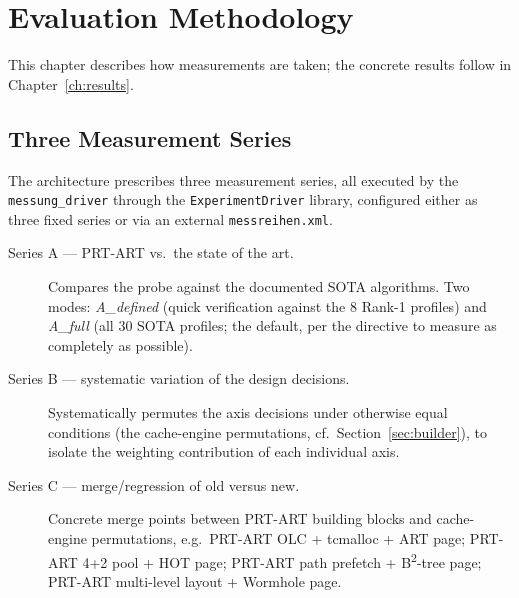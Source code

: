 \chapter{Evaluation Methodology}\label{ch:methodology}

This chapter describes how measurements are taken; the concrete results follow in
Chapter~\ref{ch:results}.

\section{Three Measurement Series}\label{sec:series}

The architecture prescribes three measurement series, all executed by the \texttt{messung\_driver}
through the \texttt{ExperimentDriver} library, configured either as three fixed series or via an
external \texttt{messreihen.xml}.

\begin{description}
  \item[Series A --- PRT-ART vs.\ the state of the art.] Compares the probe against the documented
  SOTA algorithms. Two modes: \emph{A\_defined} (quick verification against the 8 Rank-1 profiles)
  and \emph{A\_full} (all 30 SOTA profiles; the default, per the directive to measure as completely
  as possible).
  \item[Series B --- systematic variation of the design decisions.] Systematically permutes the
  axis decisions under otherwise equal conditions (the cache-engine permutations,
  cf.\ Section~\ref{sec:builder}), to isolate the weighting contribution of each individual axis.
  \item[Series C --- merge/regression of old versus new.] Concrete merge points between PRT-ART building blocks
  and cache-engine permutations, e.g.\ PRT-ART OLC + tcmalloc + ART page; PRT-ART 4+2 pool + HOT
  page; PRT-ART path prefetch + B\textsuperscript{2}-tree page; PRT-ART multi-level layout +
  Wormhole page.
\end{description}

